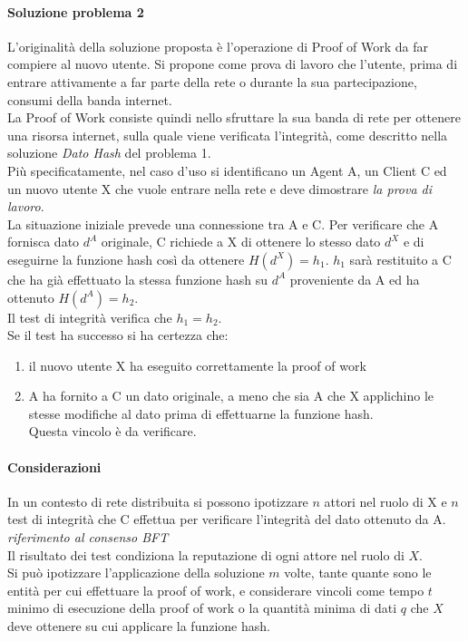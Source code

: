 	\paragraph{Soluzione problema 2}
	L'originalità della soluzione proposta è l'operazione di Proof of Work da far compiere al nuovo utente. Si propone come prova di lavoro che l'utente, prima di entrare attivamente a far parte della rete o durante la sua partecipazione, consumi della banda internet.\\
	La Proof of Work consiste quindi nello sfruttare la sua banda di rete per ottenere una risorsa internet, sulla quale viene verificata l'integrità, come descritto nella soluzione \textit{Dato Hash} del problema 1.\\ 
	Più specificatamente, nel caso d'uso si identificano un Agent A, un Client C ed un nuovo utente X che vuole entrare nella rete e deve dimostrare \textit{la prova di lavoro}.\\
	La situazione iniziale prevede una connessione tra A e C. Per verificare che A fornisca dato $d^A$ originale, C richiede a X di ottenere lo stesso dato $d^X$ e di eseguirne la funzione hash così da ottenere  $H(d^X)=h_1$. $h_1$ sarà restituito a C che ha già effettuato la stessa funzione hash su $d^A$ proveniente da A ed ha ottenuto $H(d^A) = h_2$.\\
	Il test di integrità verifica che $h_1 = h_2$.\\
	Se il test ha successo si ha certezza che:
	\begin{enumerate}
		\item il nuovo utente X ha eseguito correttamente la proof of work 
		\item A ha fornito a C un dato originale, a meno che sia A che X applichino le stesse modifiche al dato prima di effettuarne la funzione hash.\\Questa vincolo è da verificare.
	\end{enumerate}
	
	\paragraph{Considerazioni}
	In un contesto di rete distribuita si possono ipotizzare $n$ attori nel ruolo di X e $n$ test di integrità che C effettua per verificare l'integrità del dato ottenuto da A. \textit{riferimento al consenso BFT}\\
	Il risultato dei test condiziona la reputazione di ogni attore nel ruolo di $X$.\\
	Si può ipotizzare l'applicazione della soluzione $m$ volte, tante quante sono le entità per cui effettuare la proof of work, e considerare vincoli come tempo $t$ minimo di esecuzione della proof of work o la quantità minima di dati $q$ che $X$ deve ottenere su cui applicare la funzione hash.\\
	
